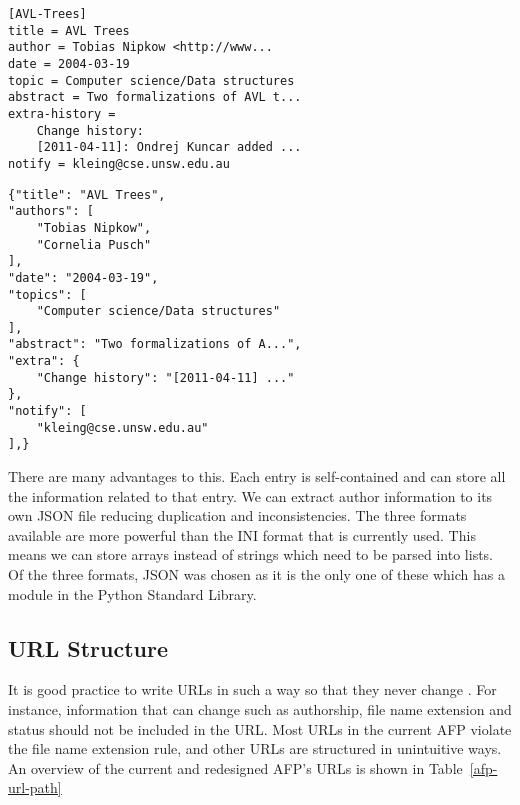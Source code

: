 \documentclass[bsc,frontabs,oneside,singlespacing,parskip,deptreport,logo]{infthesis}
\begin{document}
\begin{minipage}[t]{0.47\textwidth}
{\footnotesize
\begin{verbatim}
[AVL-Trees]
title = AVL Trees
author = Tobias Nipkow <http://www...
date = 2004-03-19
topic = Computer science/Data structures
abstract = Two formalizations of AVL t...
extra-history =
    Change history:
    [2011-04-11]: Ondrej Kuncar added ...
notify = kleing@cse.unsw.edu.au
\end{verbatim}
}
\end{minipage}\hfill
\begin{minipage}[t]{0.47\textwidth}
{\footnotesize
\begin{verbatim}
{"title": "AVL Trees",
"authors": [ 
    "Tobias Nipkow",
    "Cornelia Pusch"
],
"date": "2004-03-19",
"topics": [
    "Computer science/Data structures"
],
"abstract": "Two formalizations of A...",
"extra": {
    "Change history": "[2011-04-11] ..."
},
"notify": [
    "kleing@cse.unsw.edu.au"
],}
\end{verbatim}
}
\end{minipage}

There are many advantages to this. Each entry is self-contained and can store all the information related to that entry. We can extract author information to its own JSON file reducing duplication and inconsistencies. The three formats available are more powerful than the INI format that is currently used. This means we can store arrays instead of strings which need to be parsed into lists. Of the three formats, JSON was chosen as it is the only one of these which has a module in the Python Standard Library.

\subsection{URL Structure}

It is good practice to write URLs in such a way so that they never change \cite{berners1998cool}. For instance, information that can change such as authorship, file name extension and status should not be included in the URL. Most URLs in the current AFP violate the file name extension rule, and other URLs are structured in unintuitive ways. An overview of the current and redesigned AFP's URLs is shown in Table~\ref{afp-url-path}
\end{document}
